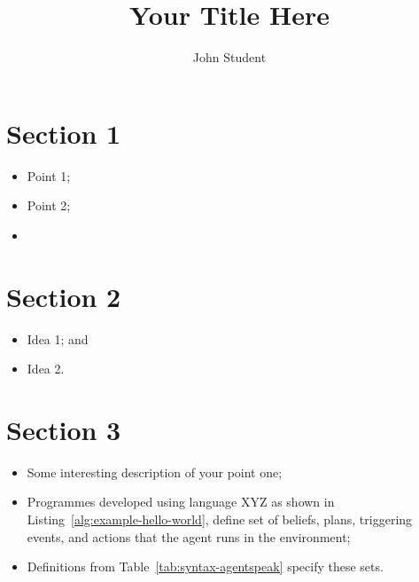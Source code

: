 \documentclass[a0,portrait]{lab-poster}
\title{Your Title Here}
\author{John Student}
\begin{document}
\maketitle


\begin{multicols}{2} 
\section*{Section 1}
\Large
\justifying

\begin{itemize}
	\item Point 1;
	\item Point 2;
	\item 
\end{itemize}

\section*{\huge Section 2}

\begin{itemize}
	\item Idea 1; and
	\item Idea 2.
\end{itemize}

\section*{\huge Section 3}

\begin{itemize}
	\item Some interesting description of your point one;
	\item Programmes developed using language XYZ as shown in Listing~\ref{alg:example-hello-world}, define set of beliefs, plans, triggering events, and actions that the agent runs in the environment;
	\item Definitions from Table~\ref{tab:syntax-agentspeak} specify these sets.
\end{itemize}


\end{multicols}
\end{document}
